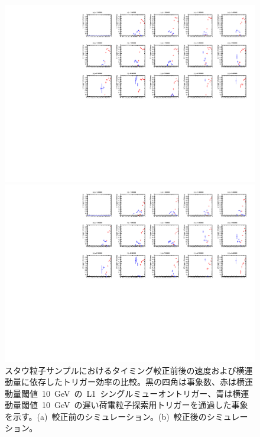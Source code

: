 \begin{figure}[tbp]
    \begin{minipage}{0.49\hsize}
    \centering   
    \includegraphics[width=\textwidth,page=15]{img/rec/stau_600_ori.pdf}
    \subcaption{}
    \end{minipage}
    \begin{minipage}{0.49\hsize}
    \centering   
    \includegraphics[width=\textwidth,page=15]{img/rec/stau_600.pdf}
    \subcaption{}
    \end{minipage}
    \caption[スタウ粒子サンプルにおけるタイミング較正前後の速度および横運動量に依存したトリガー効率の比較]{スタウ粒子サンプルにおけるタイミング較正前後の速度および横運動量に依存したトリガー効率の比較。黒の四角は事象数、赤は横運動量閾値~10~GeV~の~L1~シングルミューオントリガー、青は横運動量閾値~10~GeV~の遅い荷電粒子探索用トリガーを通過した事象を示す。(a)~較正前のシミュレーション。(b)~較正後のシミュレーション。}\label{fig:triptbeta}
\end{figure}
